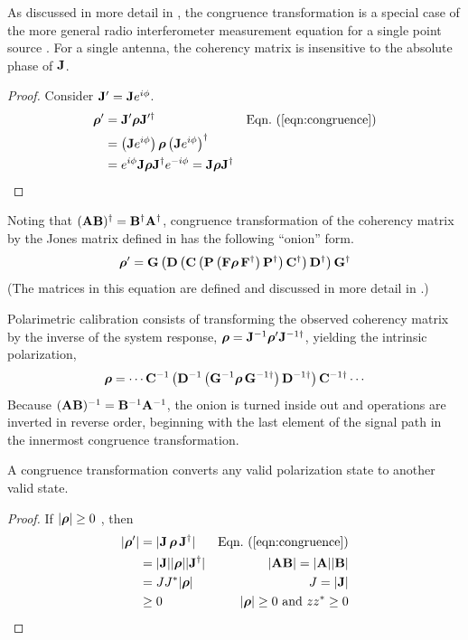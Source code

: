 As discussed in more detail in , the congruence transformation is a special case of the more general radio interferometer measurement equation for a single point source \citep{ham00,smi11a}.
%
For a single antenna, the coherency matrix is insensitive to the absolute phase of ${\bf J}$.

\begin{proof}
\label{proof:coherency_matrix_is_detected}
Consider ${\bf J}' = {\bf J}e^{i\phi}$.
%
\begin{align*}
\cohM{\rho}' 
&= \JM{J}' \cohM{\rho}\JM{J}^{\prime\dagger} 
	& \peqn{congruence} \\
&= \left(\JM{J}e^{i\phi}\right) \cohM{\rho} \left(\JM{J}e^{i\phi} \right)^{\dagger}
	& \\
&= e^{i\phi} \JM{J}\cohM{\rho}\JM{J}^\dagger e^{-i\phi} 
= \JM{J}\cohM{\rho}\JM{J}^\dagger
\end{align*}
\end{proof}

Noting that $({\bf A}{\bf B})^\dagger = {\bf B}^\dagger {\bf A}^\dagger$,
congruence transformation of the coherency matrix by the 
Jones matrix defined in  has the following ``onion'' form.
%
\begin{equation}
{\mbox{\boldmath $\rho$}'}=
{\bf G} \left(
{\bf D} \left(
{\bf C} \left(
{\bf P} \left(
{\bf F}
\mbox{\boldmath $\rho$} \,
{\bf F}^\dagger \right)
{\bf P}^\dagger \right)
{\bf C}^\dagger \right)
{\bf D}^\dagger \right)
{\bf G}^\dagger
\label{eqn:onion}
\end{equation}
%
(The matrices in this equation are defined and discussed in more detail in .)

Polarimetric calibration consists of transforming the observed coherency matrix by the inverse of the system response, 
$\mbox{\boldmath $\rho$}={{\bf J}^{-1}}\mbox{\boldmath $\rho$}' {\bf J}^{-1\dagger}$, yielding the intrinsic polarization,
%
\begin{equation} 
\cohM{\rho} =
\cdots
\JM{C}^{-1} \left(
\JM{D}^{-1} \left(
\JM{G}^{-1}
\cohM{\rho} \,
\JM{G}^{-1\dagger} \right)
\JM{D}^{-1\dagger} \right)
\JM{C}^{-1\dagger}
\cdots
\label{eqn:inverse_onion}
\end{equation}
%
Because $({\bf A}{\bf B})^{-1} = {\bf B}^{-1} {\bf A}^{-1}$, the onion is turned inside out and operations are inverted in reverse order, beginning with the last element of the signal path in the innermost congruence transformation.

A congruence transformation converts any valid 
polarization state to another valid state.
%
\begin{proof}
\label{proof:only_valid}
If $|\mbox{\boldmath $\rho$}| \ge 0$ , then
%
\begin{align*}
| \cohM{\rho}' |
&= | \JM{J} \, \cohM{\rho} \, \JM{J}^\dagger |
	& \peqn{congruence} \\
&= | \JM{J} | |\cohM{\rho}| | \JM{J}^\dagger |
	& |\JM{A}\JM{B}| = |\JM{A}||\JM{B}| \\
&= JJ^* |\cohM{\rho}| & J = | \JM{J} | \\
& \ge 0    & |\cohM{\rho}| \ge 0 \text{ and } zz^* \ge 0
\end{align*}
\end{proof}
%
\noindent

